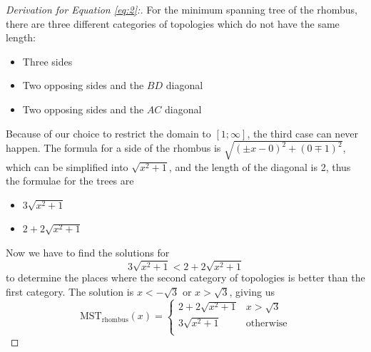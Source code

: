 \documentclass{mpaper}
\begin{document}
\begin{proof} [Derivation for Equation \ref{eq:2}:]
  For the minimum spanning tree of the rhombus, there are three different categories of topologies which do not have the same length:
  \begin{itemize}
    \item Three sides
    \item Two opposing sides and the $BD$ diagonal
    \item Two opposing sides and the $AC$ diagonal
  \end{itemize}
  Because of our choice to restrict the domain to $[1;\infty]$, the third case can never happen. The formula for a side of the rhombus is $\sqrt{(\pm x-0)^2+(0\mp 1)^2}$, which can be simplified into $\sqrt{x^2+1}$, and the length of the diagonal is 2, thus the formulae for the trees are
  \begin{itemize}
    \item $3\sqrt{x^2+1}$
    \item $2+2\sqrt{x^2+1}$
  \end{itemize}
  Now we have to find the solutions for $$3\sqrt{x^2+1} < 2+2\sqrt{x^2+1}$$  to determine the places where the second  category of topologies is better than the first category. The solution is $x<-\sqrt{3}$ or $x>\sqrt{3}$, giving us
\[
  \operatorname{MST_{rhombus}}(x)=  
\begin{cases} 
  2+2\sqrt{x^2+1} & x >\sqrt{3} \\
  3\sqrt{x^2+1} & \text{otherwise} \\
\end{cases}
\]
\end{proof}
\end{document}
